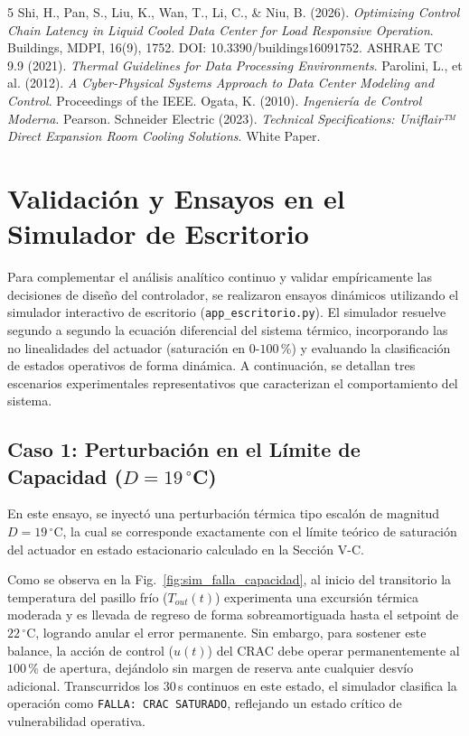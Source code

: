 \documentclass[journal,twocolumn]{IEEEtran}
\begin{document}
\begin{thebibliography}{5}
 Shi, H., Pan, S., Liu, K., Wan, T., Li, C., \& Niu, B. (2026). \textit{Optimizing Control Chain Latency in Liquid Cooled Data Center for Load Responsive Operation}. Buildings, MDPI, 16(9), 1752. DOI: 10.3390/buildings16091752.
 ASHRAE TC 9.9 (2021). \textit{Thermal Guidelines for Data Processing Environments}.
 Parolini, L., et al. (2012). \textit{A Cyber-Physical Systems Approach to Data Center Modeling and Control}. Proceedings of the IEEE.
 Ogata, K. (2010). \textit{Ingeniería de Control Moderna}. Pearson.
 Schneider Electric (2023). \textit{Technical Specifications: Uniflair™ Direct Expansion Room Cooling Solutions}. White Paper.
\end{thebibliography}

\clearpage
\onecolumn
\appendices

\section{Validación y Ensayos en el Simulador de Escritorio}
\label{sec:sim_tiempo_real}

Para complementar el análisis analítico continuo y validar empíricamente las decisiones de diseño del controlador, se realizaron ensayos dinámicos utilizando el simulador interactivo de escritorio (\texttt{app\_escritorio.py}). El simulador resuelve segundo a segundo la ecuación diferencial del sistema térmico, incorporando las no linealidades del actuador (saturación en $0$-$100$\,\%) y evaluando la clasificación de estados operativos de forma dinámica. A continuación, se detallan tres escenarios experimentales representativos que caracterizan el comportamiento del sistema.

\subsection{Caso 1: Perturbación en el Límite de Capacidad \texorpdfstring{($D = 19$\,$^\circ$C)}{D = 19 C}}
En este ensayo, se inyectó una perturbación térmica tipo escalón de magnitud $D = 19$\,$^\circ$C, la cual se corresponde exactamente con el límite teórico de saturación del actuador en estado estacionario calculado en la Sección V-C. 

Como se observa en la Fig.~\ref{fig:sim_falla_capacidad}, al inicio del transitorio la temperatura del pasillo frío ($T_{out}(t)$) experimenta una excursión térmica moderada y es llevada de regreso de forma sobreamortiguada hasta el setpoint de $22$\,$^\circ$C, logrando anular el error permanente. Sin embargo, para sostener este balance, la acción de control ($u(t)$) del CRAC debe operar permanentemente al $100$\,\% de apertura, dejándolo sin margen de reserva ante cualquier desvío adicional. Transcurridos los $30$\,s continuos en este estado, el simulador clasifica la operación como \texttt{FALLA: CRAC SATURADO}, reflejando un estado crítico de vulnerabilidad operativa.
\end{document}
